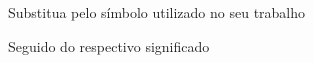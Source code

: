 
\begin{simbolos} \itemsep -1pt
	\item[$ n $] Substitua pelo símbolo utilizado no seu trabalho
	\item[$ \alpha $] Seguido do respectivo significado
\end{simbolos}
